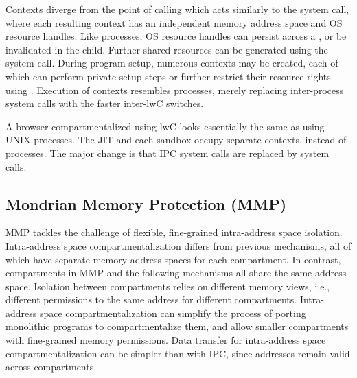 Contexts diverge from the point of calling  which acts similarly
to the  system call, where each resulting context has an 
independent memory address space and OS resource handles.
Like processes, OS resource handles can persist across a , or be
invalidated in the child.
Further shared resources can be generated using the  system 
call.
During program setup, numerous contexts may be created, each of which can
perform private setup steps or further restrict their resource rights using
.
Execution of contexts resembles processes, merely replacing inter-process system
calls with the faster inter-lwC switches.

A browser compartmentalized using lwC looks essentially the same as
using UNIX processes. 
The JIT and each sandbox occupy separate contexts, instead of processes.
The major change is that IPC system calls are replaced by 
system calls.

\subsection{Mondrian Memory Protection (MMP)}
MMP tackles the challenge of flexible, fine-grained intra-address space 
isolation.
Intra-address space compartmentalization differs from previous mechanisms,
all of which have separate memory address spaces for each compartment.
In contrast, compartments in MMP and the following mechanisms all share the
same address space.
Isolation between compartments relies on different 
memory views, i.e., different permissions to the same address for 
different compartments.
Intra-address space compartmentalization can simplify the process of
porting monolithic programs to compartmentalize them, and allow
smaller compartments with fine-grained memory permissions.
Data transfer for intra-address space compartmentalization can be simpler
than with IPC, since addresses remain valid across compartments.

